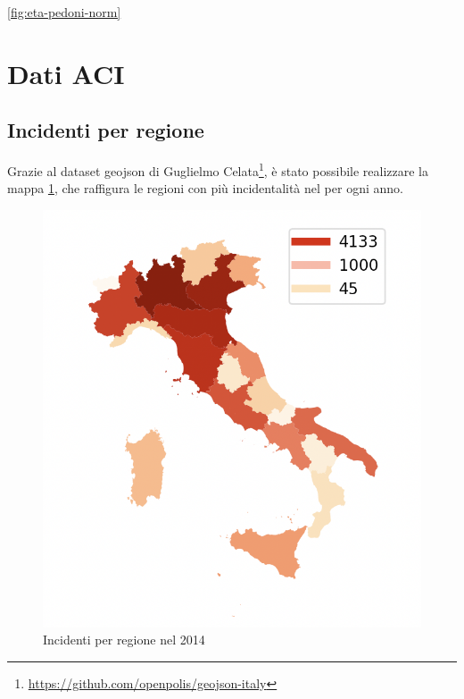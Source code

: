 \documentclass[a4paper]{report}
\begin{document}
\ref{fig:eta-pedoni-norm}








\section{Dati ACI}


\subsection{Incidenti per regione}

Grazie al dataset geojson di Guglielmo Celata\footnote{\url{https://github.com/openpolis/geojson-italy}}, 
è stato possibile realizzare la mappa \ref{fig:incidenti-per-regione}, che raffigura le regioni con 
più incidentalità nel per ogni anno.

\begin{figure}
    \includegraphics[width=\linewidth]{../src/incidenti/incidenti_aci/mappe_regioni/incidenti_per_regione.png}
    \caption{Incidenti per regione nel 2014}
    \label{fig:incidenti-per-regione}
\end{figure}
\end{document}
